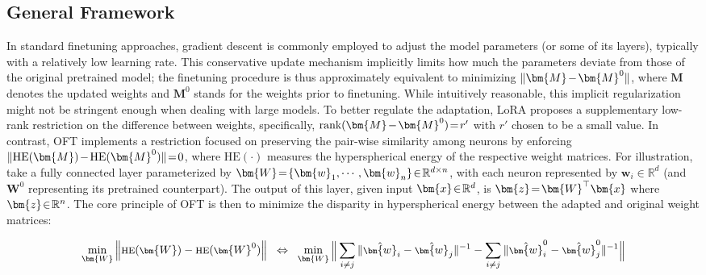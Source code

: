 \subsection{General Framework}

In standard finetuning approaches, gradient descent is commonly employed to adjust the model parameters (or some of its layers), typically with a relatively low learning rate. This conservative update mechanism implicitly limits how much the parameters deviate from those of the original pretrained model; the finetuning procedure is thus approximately equivalent to minimizing $\thickmuskip=2mu \medmuskip=2mu \| \bm{M} - \bm{M}^0\|$, where $\bm{M}$ denotes the updated weights and $\bm{M}^0$ stands for the weights prior to finetuning. While intuitively reasonable, this implicit regularization might not be stringent enough when dealing with large models. To better regulate the adaptation, LoRA proposes a supplementary low-rank restriction on the difference between weights, specifically, $\thickmuskip=2mu \medmuskip=2mu \text{rank}(\bm{M} - \bm{M}^0)=r'$ with $r'$ chosen to be a small value. In contrast, OFT implements a restriction focused on preserving the pair-wise similarity among neurons by enforcing $\thickmuskip=2mu \medmuskip=2mu \| \text{HE}(\bm{M})-\text{HE}(\bm{M}^0) \|=0$, where $\text{HE}(\cdot)$ measures the hyperspherical energy of the respective weight matrices. For illustration, take a fully connected layer parameterized by $\thickmuskip=2mu \medmuskip=2mu \bm{W}=\{\bm{w}_1,\cdots,\bm{w}_n\}\in\mathbb{R}^{d\times n}$, with each neuron represented by $\bm{w}_i\in\mathbb{R}^{d}$ (and $\bm{W}^0$ representing its pretrained counterpart). The output of this layer, given input $\thickmuskip=2mu \medmuskip=2mu \bm{x}\in\mathbb{R}^d$, is $\thickmuskip=2mu \medmuskip=2mu \bm{z}=\bm{W}^\top\bm{x}$ where $\thickmuskip=2mu \medmuskip=2mu \bm{z}\in\mathbb{R}^n$. The core principle of OFT is then to minimize the disparity in hyperspherical energy between the adapted and original weight matrices:

\begin{equation}\label{eq:oft_principle}
\footnotesize
\min_{\bm{W}} \left\| \text{HE}(\bm{W})-\text{HE}(\bm{W}^0)\right\|~~\Leftrightarrow~~\min_{\bm{W}} \bigg{\|} \sum_{i\neq j} \|\hat{\bm{w}}_i-\hat{\bm{w}}_j\|^{-1}-\sum_{i\neq j} \|\hat{\bm{w}}^0_i-\hat{\bm{w}}^0_j\|^{-1}\bigg{\|}
\end{equation}

